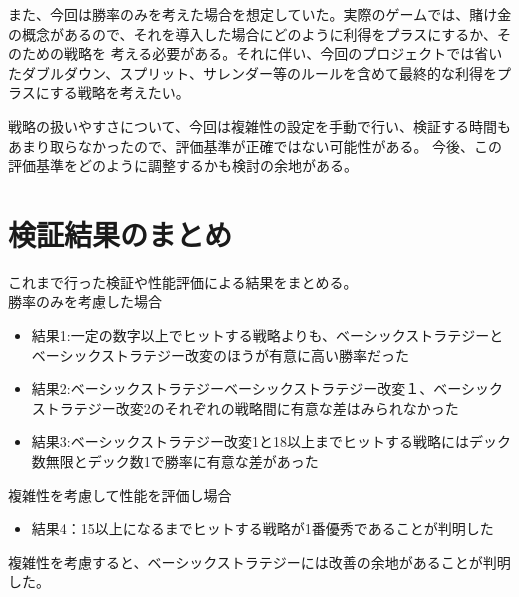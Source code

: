 また、今回は勝率のみを考えた場合を想定していた。実際のゲームでは、賭け金の概念があるので、それを導入した場合にどのように利得をプラスにするか、そのための戦略を
考える必要がある。それに伴い、今回のプロジェクトでは省いたダブルダウン、スプリット、サレンダー等のルールを含めて最終的な利得をプラスにする戦略を考えたい。

戦略の扱いやすさについて、今回は複雑性の設定を手動で行い、検証する時間もあまり取らなかったので、評価基準が正確ではない可能性がある。
今後、この評価基準をどのように調整するかも検討の余地がある。


\section{検証結果のまとめ}
これまで行った検証や性能評価による結果をまとめる。\\
勝率のみを考慮した場合
\begin{itemize}
\item 結果1:一定の数字以上でヒットする戦略よりも、ベーシックストラテジーとベーシックストラテジー改変のほうが有意に高い勝率だった
\item 結果2:ベーシックストラテジーベーシックストラテジー改変１、ベーシックストラテジー改変2のそれぞれの戦略間に有意な差はみられなかった
\item 結果3:ベーシックストラテジー改変1と18以上までヒットする戦略にはデック数無限とデック数1で勝率に有意な差があった
\end{itemize}
複雑性を考慮して性能を評価し場合
\begin{itemize}
\item 結果4：15以上になるまでヒットする戦略が1番優秀であることが判明した
\end{itemize}
複雑性を考慮すると、ベーシックストラテジーには改善の余地があることが判明した。